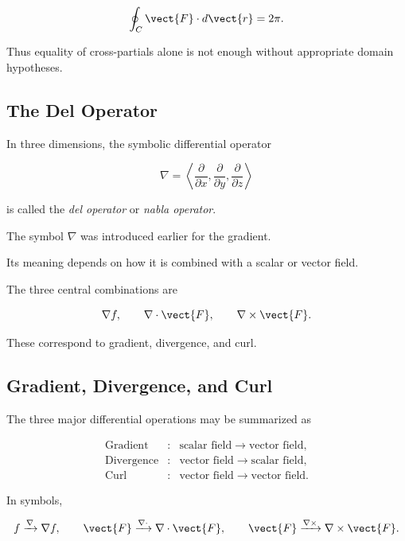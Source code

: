 \[ \oint_C\vect{F}\cdot d\vect{r}=2\pi. \]

Thus equality of cross-partials alone is not enough without appropriate
domain hypotheses.

\subsection{The Del Operator}
\label{subsec:del-operator}

In three dimensions, the symbolic differential operator

\[ \nabla
=
\left\langle
\frac{\partial}{\partial x},
\frac{\partial}{\partial y},
\frac{\partial}{\partial z}
\right\rangle \]

is called the \emph{del operator} or \emph{nabla operator}.

The symbol \(\nabla\) was introduced earlier for the gradient.

Its meaning depends on how it is combined with a scalar or vector field.

The three central combinations are

\[ \nabla f,\qquad \nabla\cdot\vect{F},\qquad \nabla\times\vect{F}. \]

These correspond to gradient, divergence, and curl.

\subsection{Gradient, Divergence, and Curl}
\label{subsec:grad-div-curl}

The three major differential operations may be summarized as

\[
\begin{array}{ccl}
\text{Gradient} &:& \text{scalar field}\longrightarrow\text{vector field},\\[1mm]
\text{Divergence} &:& \text{vector field}\longrightarrow\text{scalar field},\\[1mm]
\text{Curl} &:& \text{vector field}\longrightarrow\text{vector field}.
\end{array}
\]

In symbols,

\[ f\xrightarrow{\nabla}\nabla f, \qquad
\vect{F}\xrightarrow{\nabla\cdot}\nabla\cdot\vect{F}, \qquad
\vect{F}\xrightarrow{\nabla\times}\nabla\times\vect{F}. \]


